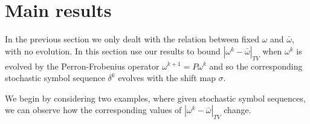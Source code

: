 \documentclass[final]{siamltex}
\DeclareMathOperator{\erf}{erf}
\begin{document}






\section{Main results}
\label{sec:mainresults}

In the previous section we only dealt with the relation between fixed
$\omega$ and $\bar{\omega}$, with no evolution. In this section use
our results to bound $|\omega^k-\bar{\omega}|_{TV}$ when $\omega^k$ is
evolved by the Perron-Frobenius operator $\omega^{k+1} = P \omega^k$
and so the corresponding stochastic symbol sequence $\delta^k$ evolves
with the shift map $\sigma$.

We begin by considering two examples, where given stochastic symbol
sequences, we can observe how the corresponding values of
$|\omega^k-\bar{\omega}|_{TV}$ change.
\end{document}
